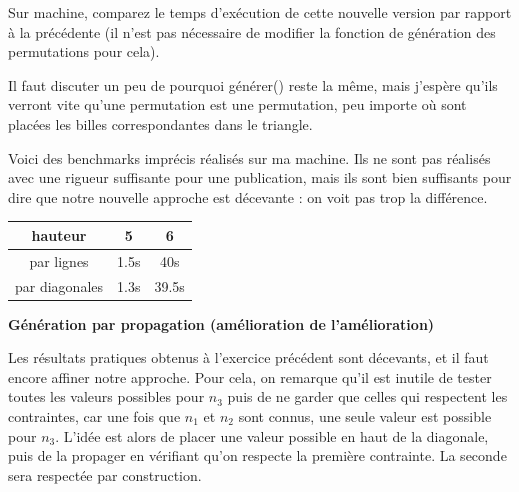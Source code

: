 \documentclass[10pt]{article}\usepackage[correction,nu]{esial}
\begin{document}
\begin{Question}
  Sur machine, comparez le temps d'exécution de cette nouvelle version par
  rapport à la précédente (il n'est pas nécessaire de modifier la fonction de
  génération des permutations pour cela).
\end{Question}

\begin{Reponse}
  Il faut discuter un peu de pourquoi générer() reste la même, mais j'espère
  qu'ils verront vite qu'une permutation est une permutation, peu importe où
  sont placées les billes correspondantes dans le triangle.
  
  Voici des benchmarks imprécis réalisés sur ma machine. Ils ne sont pas
  réalisés avec une rigueur suffisante pour une publication, mais ils sont bien
  suffisants pour dire que notre nouvelle approche est décevante : on voit pas
  trop la différence.

  \begin{tabular}{|c|c|c|}\hline
    hauteur       &5&6\\\hline
    par lignes    &1.5s&40s\\\hline
    par diagonales&1.3s&39.5s\\\hline
  \end{tabular}
\end{Reponse}

\begin{Exercice}\textbf{Génération par propagation (amélioration de l'amélioration)}
\end{Exercice}

\noindent Les résultats pratiques obtenus à l'exercice précédent sont décevants,
et il faut encore affiner notre approche. Pour cela, on remarque qu'il est
inutile de tester toutes les valeurs possibles pour $n_3$ puis de ne garder que
celles qui respectent les contraintes, car une fois que $n_1$ et $n_2$ sont
connus, une seule valeur est possible pour $n_3$. L'idée est alors de placer
une valeur possible en haut de la diagonale, puis de la propager en vérifiant
qu'on respecte la première contrainte. La seconde sera respectée par construction.
\end{document}
